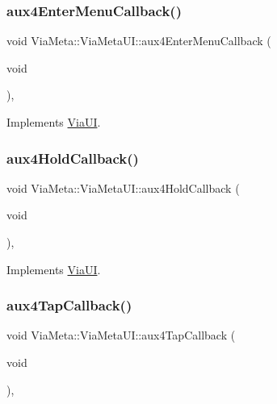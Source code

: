 \subsubsection{\texorpdfstring{aux4\+Enter\+Menu\+Callback()}{aux4EnterMenuCallback()}}
{\footnotesize\ttfamily void Via\+Meta\+::\+Via\+Meta\+U\+I\+::aux4\+Enter\+Menu\+Callback (\begin{DoxyParamCaption}\item[{void}]{ }\end{DoxyParamCaption})\hspace{0.3cm}{\ttfamily [override]}, {\ttfamily [virtual]}}



Implements \mbox{\hyperlink{class_via_u_i_a36cc4bac8f774c2a59ab8635be05f884}{Via\+UI}}.

\mbox{\label{class_via_meta_1_1_via_meta_u_i_a2a1cfb3452d150af61f61716aa94f782}} 
\subsubsection{\texorpdfstring{aux4\+Hold\+Callback()}{aux4HoldCallback()}}
{\footnotesize\ttfamily void Via\+Meta\+::\+Via\+Meta\+U\+I\+::aux4\+Hold\+Callback (\begin{DoxyParamCaption}\item[{void}]{ }\end{DoxyParamCaption})\hspace{0.3cm}{\ttfamily [override]}, {\ttfamily [virtual]}}



Implements \mbox{\hyperlink{class_via_u_i_a884790ab6dac8e6f49104146ff620512}{Via\+UI}}.

\mbox{\label{class_via_meta_1_1_via_meta_u_i_ad8e6300990d654091672b0f94a9b47d8}} 
\subsubsection{\texorpdfstring{aux4\+Tap\+Callback()}{aux4TapCallback()}}
{\footnotesize\ttfamily void Via\+Meta\+::\+Via\+Meta\+U\+I\+::aux4\+Tap\+Callback (\begin{DoxyParamCaption}\item[{void}]{ }\end{DoxyParamCaption})\hspace{0.3cm}{\ttfamily [override]}, {\ttfamily [virtual]}}



